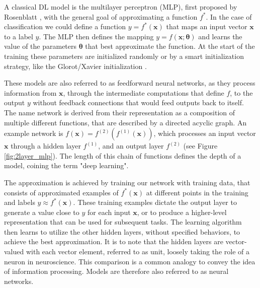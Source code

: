 A classical DL model is the multilayer perceptron (MLP), first proposed by Rosenblatt \cite{rosenblatt1958perceptron}, with the general goal of approximating a function $f^*$. In the case of classification we could define a function $y = f^*(\mathbf{x})$ that maps an input vector $\mathbf{x}$ to a label $y$. The MLP then defines the mapping $y = f(\mathbf{x};\boldsymbol{\theta})$ and learns the value of the parameters $\boldsymbol{\theta}$ that best approximate the function. At the start of the training these parameters are initialized randomly or by a smart initialization strategy, like the Glorot/Xavier initialization \cite{glorot2010understanding}. \bigskip

These models are also referred to as feedforward neural networks, as they process information from $\mathbf{x}$, through the intermediate computations that define $f$, to the output $y$ without feedback connections that would feed outputs back to itself. The name network is derived from their representation as a composition of multiple different functions, that are described by a directed acyclic graph. An example network is $f(\mathbf{x}) = f^{(2)}(f^{(1)}(\mathbf{x}))$, which processes an input vector $\mathbf{x}$ through a hidden layer $f^{(1)}$, and an output layer $f^{(2)}$ (see Figure \ref{fig:2layer_mlp}).  The length of this chain of functions defines the depth of a model, coining the term "deep learning". 

The approximation is achieved by training our network with training data, that consists of approximated examples of $f^*(\mathbf{x})$ at different points in the training and labels $y\approx f^*(\mathbf{x})$. These training examples dictate the output layer to generate a value close to $y$ for each input $\mathbf{x}$, or to produce a higher-level representation that can be used for subsequent tasks. The learning algorithm then learns to utilize the other hidden layers, without specified behaviors, to achieve the best approximation. It is to note that the hidden layers are vector-valued with each vector element, referred to as unit, loosely taking the role of a neuron in neuroscience. This comparison is a common analogy to convey the idea of information processing. Models are therefore also referred to as neural networks.


